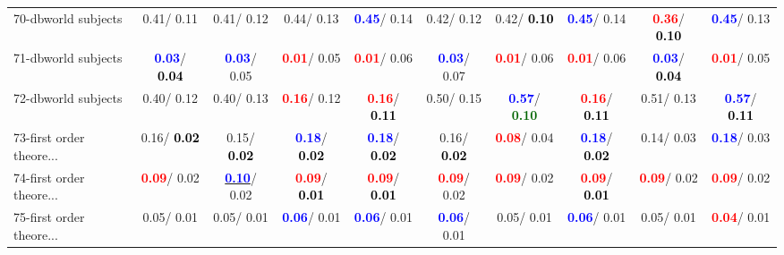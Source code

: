 \begin{table}[h]
\begin{center}
{\begin{tabular}{lc|c|c|c|c|c|c|c|c}
70-dbworld subjects &   0.41/  0.11 &   0.41/  0.12 &   0.44/  0.13 & \textcolor{blue}{\textbf{  0.45}}/  0.14 &   0.42/  0.12 &   0.42/\textcolor{black}{\textbf{  0.10}} & \textcolor{blue}{\textbf{  0.45}}/  0.14 & \textcolor{red}{\textbf{  0.36}}/\textcolor{black}{\textbf{  0.10}} & \textcolor{blue}{\textbf{  0.45}}/  0.13 \\
71-dbworld subjects & \textcolor{blue}{\textbf{  0.03}}/\textcolor{black}{\textbf{  0.04}} & \textcolor{blue}{\textbf{  0.03}}/  0.05 & \textcolor{red}{\textbf{  0.01}}/  0.05 & \textcolor{red}{\textbf{  0.01}}/  0.06 & \textcolor{blue}{\textbf{  0.03}}/  0.07 & \textcolor{red}{\textbf{  0.01}}/  0.06 & \textcolor{red}{\textbf{  0.01}}/  0.06 & \textcolor{blue}{\textbf{  0.03}}/\textcolor{black}{\textbf{  0.04}} & \textcolor{red}{\textbf{  0.01}}/  0.05 \\ \hline
72-dbworld subjects &   0.40/  0.12 &   0.40/  0.13 & \textcolor{red}{\textbf{  0.16}}/  0.12 & \textcolor{red}{\textbf{  0.16}}/\textcolor{black}{\textbf{  0.11}} &   0.50/  0.15 & \textcolor{blue}{\textbf{  0.57}}/\textcolor{darkgreen}{\textbf{  0.10}} & \textcolor{red}{\textbf{  0.16}}/\textcolor{black}{\textbf{  0.11}} &   0.51/  0.13 & \textcolor{blue}{\textbf{  0.57}}/\textcolor{black}{\textbf{  0.11}} \\
73-first order theore... &   0.16/\textcolor{black}{\textbf{  0.02}} &   0.15/\textcolor{black}{\textbf{  0.02}} & \textcolor{blue}{\textbf{  0.18}}/\textcolor{black}{\textbf{  0.02}} & \textcolor{blue}{\textbf{  0.18}}/\textcolor{black}{\textbf{  0.02}} &   0.16/\textcolor{black}{\textbf{  0.02}} & \textcolor{red}{\textbf{  0.08}}/  0.04 & \textcolor{blue}{\textbf{  0.18}}/\textcolor{black}{\textbf{  0.02}} &   0.14/  0.03 & \textcolor{blue}{\textbf{  0.18}}/  0.03 \\
74-first order theore... & \textcolor{red}{\textbf{  0.09}}/  0.02 & \underline{\textcolor{blue}{\textbf{  0.10}}}/  0.02 & \textcolor{red}{\textbf{  0.09}}/\textcolor{black}{\textbf{  0.01}} & \textcolor{red}{\textbf{  0.09}}/\textcolor{black}{\textbf{  0.01}} & \textcolor{red}{\textbf{  0.09}}/  0.02 & \textcolor{red}{\textbf{  0.09}}/  0.02 & \textcolor{red}{\textbf{  0.09}}/\textcolor{black}{\textbf{  0.01}} & \textcolor{red}{\textbf{  0.09}}/  0.02 & \textcolor{red}{\textbf{  0.09}}/  0.02 \\
75-first order theore... &   0.05/  0.01 &   0.05/  0.01 & \textcolor{blue}{\textbf{  0.06}}/  0.01 & \textcolor{blue}{\textbf{  0.06}}/  0.01 & \textcolor{blue}{\textbf{  0.06}}/  0.01 &   0.05/  0.01 & \textcolor{blue}{\textbf{  0.06}}/  0.01 &   0.05/  0.01 & \textcolor{red}{\textbf{  0.04}}/  0.01 \\

\end{tabular}}
\end{center}
\end{table}
